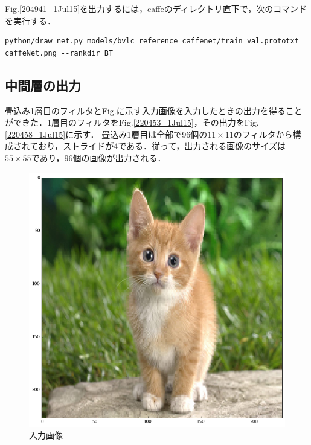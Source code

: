 \documentclass[a4paper,10pt]{jsarticle}
\begin{document}
Fig.\ref{204941_1Jul15}を出力するには，caffeのディレクトリ直下で，次のコマンドを実行する．
\begin{lstlisting}[basicstyle=\ttfamily\footnotesize, frame=single,breaklines = true]
python/draw_net.py models/bvlc_reference_caffenet/train_val.prototxt caffeNet.png --rankdir BT
\end{lstlisting}

\subsection{中間層の出力}
畳込み1層目のフィルタとFig.に示す入力画像を入力したときの出力を得ることができた．1層目のフィルタをFig.\ref{220453_1Jul15}，その出力をFig.\ref{220458_1Jul15}に示す．
畳込み1層目は全部で96個の$11\times11$のフィルタから構成されており，ストライドが4である．従って，出力される画像のサイズは$55\times55$であり，96個の画像が出力される．
\begin{figure}[t]
 \centering
 \includegraphics[scale=0.5]{fig/png/input.png}
  \caption{入力画像}
\end{figure}
\end{document}
